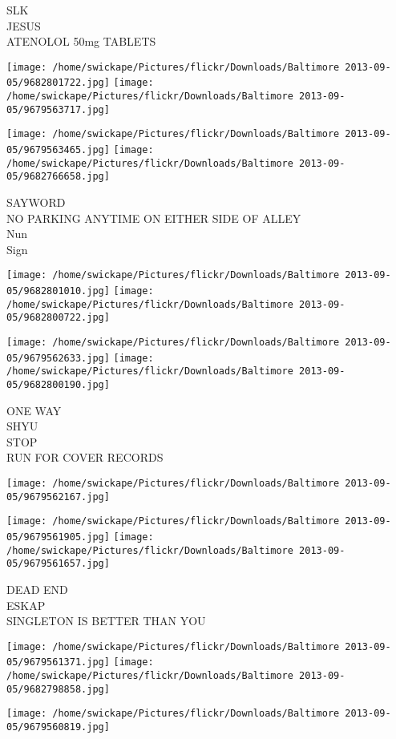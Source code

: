 \documentclass[10pt,letterpaper]{article}
\begin{document}
SLK\\
JESUS\\
ATENOLOL 50mg TABLETS
\pagebreak

\texttt{[image: /home/swickape/Pictures/flickr/Downloads/Baltimore 2013-09-05/9682801722.jpg]}
\texttt{[image: /home/swickape/Pictures/flickr/Downloads/Baltimore 2013-09-05/9679563717.jpg]}

\texttt{[image: /home/swickape/Pictures/flickr/Downloads/Baltimore 2013-09-05/9679563465.jpg]}
\texttt{[image: /home/swickape/Pictures/flickr/Downloads/Baltimore 2013-09-05/9682766658.jpg]}

SAYWORD\\
NO PARKING ANYTIME ON EITHER SIDE OF ALLEY\\
Nun\\
Sign
\pagebreak

\texttt{[image: /home/swickape/Pictures/flickr/Downloads/Baltimore 2013-09-05/9682801010.jpg]}
\texttt{[image: /home/swickape/Pictures/flickr/Downloads/Baltimore 2013-09-05/9682800722.jpg]}

\texttt{[image: /home/swickape/Pictures/flickr/Downloads/Baltimore 2013-09-05/9679562633.jpg]}
\texttt{[image: /home/swickape/Pictures/flickr/Downloads/Baltimore 2013-09-05/9682800190.jpg]}

ONE WAY\\
SHYU\\
STOP\\
RUN FOR COVER RECORDS
\pagebreak

\texttt{[image: /home/swickape/Pictures/flickr/Downloads/Baltimore 2013-09-05/9679562167.jpg]}

\vspace{0.25in}
\texttt{[image: /home/swickape/Pictures/flickr/Downloads/Baltimore 2013-09-05/9679561905.jpg]}
\texttt{[image: /home/swickape/Pictures/flickr/Downloads/Baltimore 2013-09-05/9679561657.jpg]}

DEAD END\\
ESKAP\\
SINGLETON IS BETTER THAN YOU
\pagebreak

\texttt{[image: /home/swickape/Pictures/flickr/Downloads/Baltimore 2013-09-05/9679561371.jpg]}
\texttt{[image: /home/swickape/Pictures/flickr/Downloads/Baltimore 2013-09-05/9682798858.jpg]}

\texttt{[image: /home/swickape/Pictures/flickr/Downloads/Baltimore 2013-09-05/9679560819.jpg]}
\end{document}

